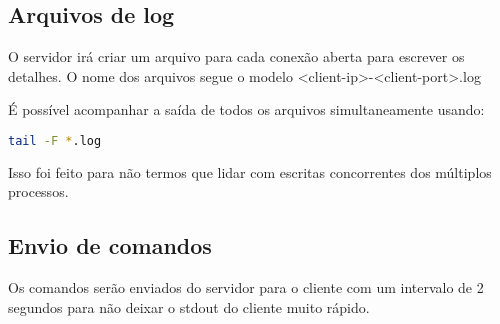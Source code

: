 \documentclass[12pt,a4paper]{report}
\begin{document}
\subsection{Arquivos de log}

O servidor irá criar um arquivo para cada conexão aberta para escrever os detalhes. O nome dos arquivos segue o modelo <client-ip>-<client-port>.log

É possível acompanhar a saída de todos os arquivos simultaneamente usando:
\begin{lstlisting}[language=bash]
  tail -F *.log
\end{lstlisting}

Isso foi feito para não termos que lidar com escritas concorrentes dos múltiplos processos.

\subsection{Envio de comandos}

Os comandos serão enviados do servidor para o cliente com um intervalo de 2 segundos para não deixar o stdout do cliente muito rápido.
\end{document}
